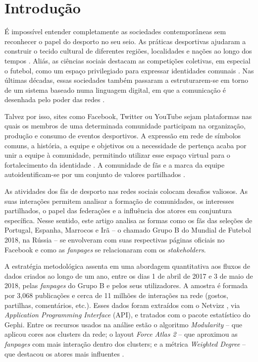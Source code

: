 \documentclass{textolivre}
\begin{document}
\section{Introdução}\label{sec-intro}
É impossível entender completamente as sociedades contemporâneas sem reconhecer o papel do desporto no seu seio. As práticas desportivas ajudaram a construir o tecido cultural de diferentes regiões, localidades e nações ao longo dos tempos \cite{jarvie2006}. Aliás, as ciências sociais destacam as competições coletivas, em especial o futebol, como um espaço privilegiado para expressar identidades comunais \cite{giulianotti2015}. Nas últimas décadas, essas sociedades também passaram a estruturarem-se em torno de um sistema baseado numa linguagem digital, em que a comunicação é desenhada pelo poder das redes \cite{castells2007}.

Talvez por isso, sites como Facebook, Twitter ou YouTube sejam plataformas nas quais os membros de uma determinada comunidade participam na organização, produção e consumo de eventos desportivos. A expressão em rede de símbolos comuns, a história, a equipe e objetivos ou a necessidade de pertença acaba por unir a equipe à comunidade, permitindo utilizar esse espaço virtual para o fortalecimento da identidade \cite{haugh2016}. A comunidade de fãs e a marca da equipe autoidentificam-se por um conjunto de valores partilhados \cite{chadwick2014, newman2017, gouveia2019, lapa2019}.

As atividades dos fãs de desporto nas redes sociais colocam desafios valiosos. As suas interações permitem analisar a formação de comunidades, os interesses partilhados, o papel das federações e a influência dos atores em conjuntura específica. Nesse sentido, este artigo analisa as formas como os fãs das seleções de Portugal, Espanha, Marrocos e Irã – o chamado Grupo B do Mundial de Futebol 2018, na Rússia – se envolveram com suas respectivas páginas oficiais no Facebook e como as \emph{fanpages} se relacionaram com os \emph{stakeholders}.

A estratégia metodológica assenta em uma abordagem quantitativa aos fluxos de dados criados ao longo de um ano, entre os dias 1 de abril de 2017 e 3 de maio de 2018, pelas \emph{fanpages} do Grupo B e pelos seus utilizadores. A amostra é formada por 3,068 publicações e cerca de 11 milhões de interações na rede (gostos, partilhas, comentários, etc.). Esses dados foram extraídos com o Netvizz \cite{rieder2013}, via \emph{Application Programming Interface} (API), e tratados com o pacote estatístico do Gephi. Entre os recursos usados na análise estão o algoritmo \emph{Modularity} – que aplicou cores aos clusters da rede; o layout \emph{Force Atlas 2} – que aproximou as \emph{fanpages} com mais interação dentro dos clusters; e a métrica \emph{Weighted Degree} – que destacou os atores mais influentes \cite{barabasi2016}.
\end{document}
